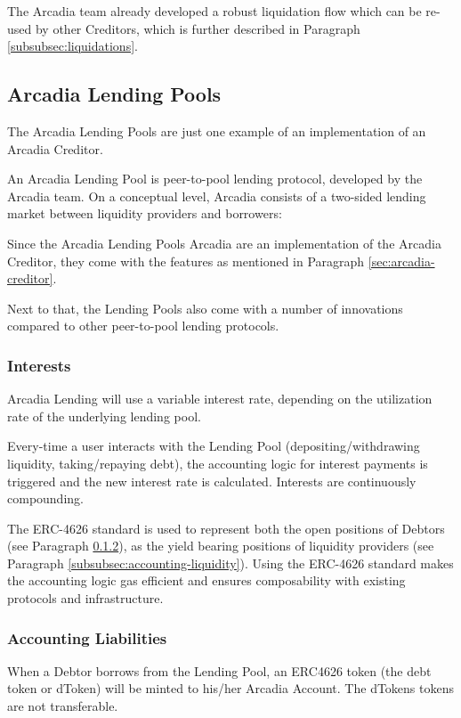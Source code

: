 \documentclass[sigconf,nonacm]{acmart}
\begin{document}
The Arcadia team already developed a robust liquidation flow which can be re-used by other Creditors,
which is further described in Paragraph \ref{subsubsec:liquidations}.

\subsection{Arcadia Lending Pools}
The Arcadia Lending Pools are just one example of an implementation of an Arcadia Creditor.

An Arcadia Lending Pool is peer-to-pool lending protocol, developed by the Arcadia team.
On a conceptual level, Arcadia consists of a two-sided lending market between liquidity providers and borrowers:

Since the Arcadia Lending Pools Arcadia are an implementation of the Arcadia Creditor,
they come with the features as mentioned in Paragraph \ref{sec:arcadia-creditor}.

Next to that, the Lending Pools also come with a number of innovations compared to other peer-to-pool lending protocols.

\subsubsection{Interests}
Arcadia Lending will use a variable interest rate, depending on the utilization rate of the underlying lending pool.

Every-time a user interacts with the Lending Pool (depositing/withdrawing liquidity, taking/repaying debt),
the accounting logic for interest payments is triggered and the new interest rate is calculated.
Interests are continuously compounding.

The ERC-4626 standard is used to represent both the open positions of Debtors (see Paragraph \ref{subsubsec:accounting-liabilities}),
as the yield bearing positions of liquidity providers (see Paragraph \ref{subsubsec:accounting-liquidity}).
Using the ERC-4626 standard makes the accounting logic gas efficient and ensures composability with existing protocols and infrastructure.

\subsubsection{Accounting Liabilities}
\label{subsubsec:accounting-liabilities}
When a Debtor borrows from the Lending Pool,
an ERC4626 token (the debt token or dToken) will be minted to his/her Arcadia Account.
The dTokens tokens are not transferable.
\end{document}

